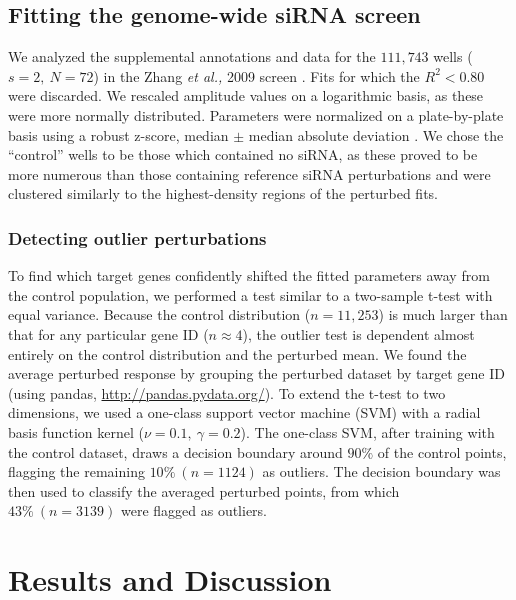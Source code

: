 \documentclass[11pt, letterpaper]{article}
\begin{document}
\subsection*{Fitting the genome-wide siRNA screen}
We analyzed the supplemental annotations and data for the $111,743$ wells ($s=2,\ N=72$) in the Zhang {\itshape et al.,} 2009 screen \cite{Zhang2009}.
Fits for which the $R^2 < 0.80$ were discarded.
We rescaled amplitude values on a logarithmic basis, as these were more normally distributed.
Parameters were normalized on a plate-by-plate basis using a robust z-score, median $\pm$ median absolute deviation \cite{Birmingham2009}.
We chose the ``control'' wells to be those which contained no siRNA, as these proved to be more numerous than those containing reference siRNA perturbations and were clustered similarly to the highest-density regions of the perturbed fits.

\subsubsection*{Detecting outlier perturbations}
To find which target genes confidently shifted the fitted parameters away from the control population, we performed a test similar to a two-sample t-test with equal variance.
Because the control distribution ($n=11,253$) is much larger than that for any particular gene ID ($n \approx 4$), the outlier test is dependent almost entirely on the control distribution and the perturbed mean. 
We found the average perturbed response by grouping the perturbed dataset by target gene ID (using pandas, \url{http://pandas.pydata.org/}).
To extend the t-test to two dimensions, we used a one-class support vector machine (SVM) with a radial basis function kernel ($\nu = 0.1,\ \gamma = 0.2$).
The one-class SVM, after training with the control dataset, draws a decision boundary around $90\%$ of the control points, flagging the remaining $10\% \ (n = 1124)$ as outliers.
The decision boundary was then used to classify the averaged perturbed points, from which $43\% \ (n = 3139)$ were flagged as outliers.


\section*{Results and Discussion}
\end{document}
